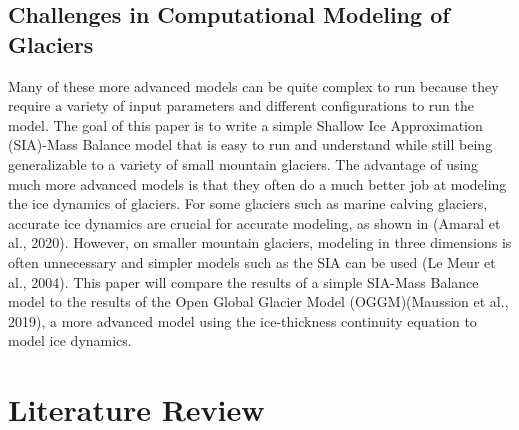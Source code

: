 \documentclass{article}
\begin{document}
\subsection{Challenges in Computational Modeling of Glaciers}
Many of these more advanced models can be quite complex to run because they require a variety of input parameters and different configurations to run the model. The 
goal of this paper is to write a simple Shallow Ice Approximation (SIA)-Mass Balance model that is easy to run and understand while still 
being generalizable to a variety of small mountain glaciers. The advantage of using much more advanced models is that they often do 
a much better job at modeling the ice dynamics of glaciers. For some glaciers such as marine calving glaciers, accurate ice dynamics are 
crucial for accurate modeling, as shown in (Amaral et al., 2020). However, on smaller mountain glaciers, modeling in three dimensions is often 
unnecessary and simpler models such as the SIA can be used (Le Meur et al., 2004). This paper will compare the results of a simple SIA-Mass Balance model to the 
results of the Open Global Glacier Model (OGGM)(Maussion et al., 2019), a more advanced model using the ice-thickness continuity equation to model ice dynamics.

\section{Literature Review}
\end{document}

